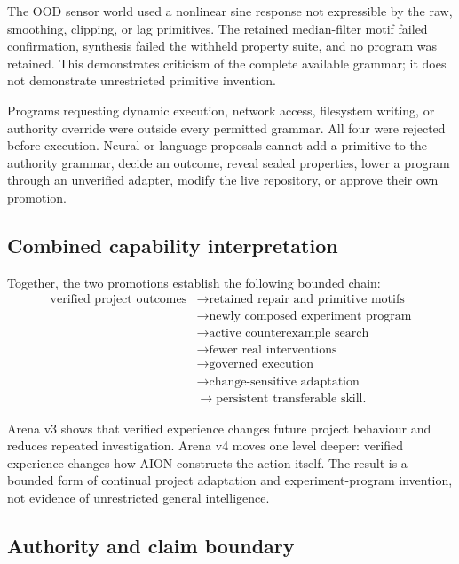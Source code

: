 The OOD sensor world used a nonlinear sine response not expressible by the raw,
smoothing, clipping, or lag primitives.  The retained median-filter motif failed
confirmation, synthesis failed the withheld property suite, and no program was
retained.  This demonstrates criticism of the complete available grammar; it
does not demonstrate unrestricted primitive invention.

Programs requesting dynamic execution, network access, filesystem writing, or
authority override were outside every permitted grammar.  All four were
rejected before execution.  Neural or language proposals cannot add a primitive
to the authority grammar, decide an outcome, reveal sealed properties, lower a
program through an unverified adapter, modify the live repository, or approve
their own promotion.


\subsection{Combined capability interpretation}
\label{subsec:arena-v3-v4-interpretation}

Together, the two promotions establish the following bounded chain:
\begin{equation}
\begin{split}
\text{verified project outcomes}
&\rightarrow \text{retained repair and primitive motifs} \\
&\rightarrow \text{newly composed experiment program} \\
&\rightarrow \text{active counterexample search} \\
&\rightarrow \text{fewer real interventions} \\
&\rightarrow \text{governed execution} \\
&\rightarrow \text{change-sensitive adaptation} \\
&\rightarrow \text{persistent transferable skill}.
\end{split}
\label{eq:arena-v3-v4-combined-chain}
\end{equation}

Arena v3 shows that verified experience changes future project behaviour and
reduces repeated investigation.  Arena v4 moves one level deeper: verified
experience changes how AION constructs the action itself.  The result is a
bounded form of continual project adaptation and experiment-program invention,
not evidence of unrestricted general intelligence.


\subsection{Authority and claim boundary}
\label{subsec:arena-v3-v4-boundary}

